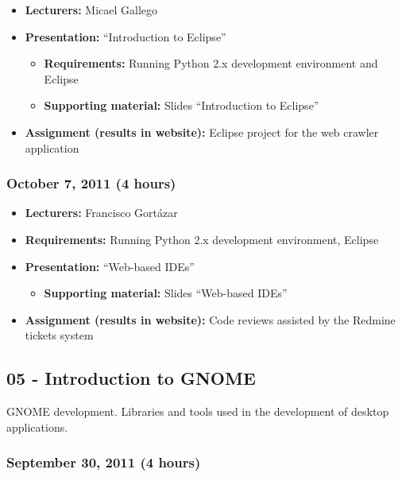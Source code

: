 \documentclass[a4paper]{article}
\begin{document}
\begin{itemize}
\item \textbf{Lecturers:} Micael Gallego
\item \textbf{Presentation:} ``Introduction to Eclipse''
  \begin{itemize}
\item \textbf{Requirements:} Running Python 2.x development
  environment and Eclipse
  \item \textbf{Supporting material:} Slides ``Introduction to Eclipse''
  \end{itemize}
\item \textbf{Assignment (results in website):} Eclipse project for
  the web crawler application
\end{itemize}

\subsubsection{October 7, 2011 (4 hours)}

\begin{itemize}
\item \textbf{Lecturers:} Francisco Gort\'azar
\item \textbf{Requirements:} Running Python 2.x development
  environment, Eclipse
\item \textbf{Presentation:} ``Web-based IDEs''
  \begin{itemize}
  \item \textbf{Supporting material:} Slides ``Web-based IDEs''
  \end{itemize}
\item \textbf{Assignment (results in website):} Code reviews assisted
  by the Redmine tickets system
\end{itemize}


\subsection{05 - Introduction to GNOME}

GNOME development. Libraries and tools used in the development of
desktop applications.

\subsubsection{September 30, 2011 (4 hours)}
\end{document}
